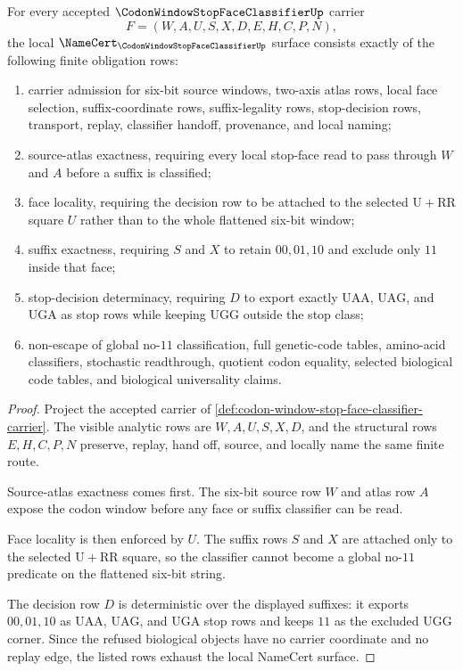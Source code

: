 \begin{theorem}
\label{thm:codon-window-stop-face-classifier-namecert-obligations}
For every accepted $\CodonWindowStopFaceClassifierUp$ carrier
$$
F=(W,A,U,S,X,D,E,H,C,P,N),
$$
the local $\NameCert_{\CodonWindowStopFaceClassifierUp}$ surface consists exactly of the following finite obligation rows:
\begin{enumerate}
\item carrier admission for six-bit source windows, two-axis atlas rows, local face selection, suffix-coordinate rows, suffix-legality rows, stop-decision rows, transport, replay, classifier handoff, provenance, and local naming;
\item source-atlas exactness, requiring every local stop-face read to pass through $W$ and $A$ before a suffix is classified;
\item face locality, requiring the decision row to be attached to the selected $\mathrm{U}+\mathrm{RR}$ square $U$ rather than to the whole flattened six-bit window;
\item suffix exactness, requiring $S$ and $X$ to retain $00,01,10$ and exclude only $11$ inside that face;
\item stop-decision determinacy, requiring $D$ to export exactly $\mathrm{UAA}$, $\mathrm{UAG}$, and $\mathrm{UGA}$ as stop rows while keeping $\mathrm{UGG}$ outside the stop class;
\item non-escape of global no-$11$ classification, full genetic-code tables, amino-acid classifiers, stochastic readthrough, quotient codon equality, selected biological code tables, and biological universality claims.
\end{enumerate}
\end{theorem}
\begin{proof}
Project the accepted carrier of \autoref{def:codon-window-stop-face-classifier-carrier}. The visible analytic rows are $W,A,U,S,X,D$, and the structural rows $E,H,C,P,N$ preserve, replay, hand off, source, and locally name the same finite route.

Source-atlas exactness comes first. The six-bit source row $W$ and atlas row $A$ expose the codon window before any face or suffix classifier can be read.

Face locality is then enforced by $U$. The suffix rows $S$ and $X$ are attached only to the selected $\mathrm{U}+\mathrm{RR}$ square, so the classifier cannot become a global no-$11$ predicate on the flattened six-bit string.

The decision row $D$ is deterministic over the displayed suffixes: it exports $00,01,10$ as $\mathrm{UAA}$, $\mathrm{UAG}$, and $\mathrm{UGA}$ stop rows and keeps $11$ as the excluded $\mathrm{UGG}$ corner. Since the refused biological objects have no carrier coordinate and no replay edge, the listed rows exhaust the local NameCert surface.
\end{proof}

